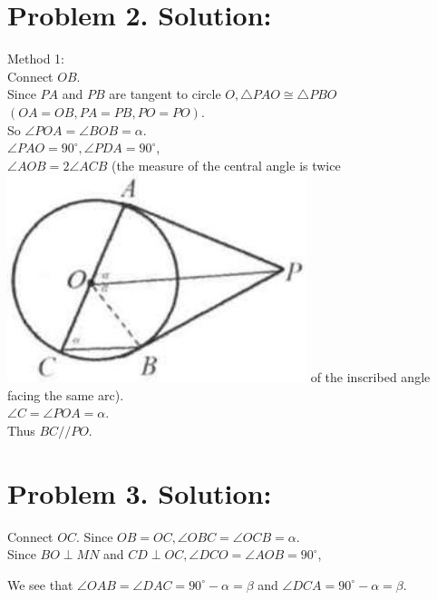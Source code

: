 \documentclass[10pt]{article}
\begin{document}
\section*{Problem 2. Solution:}
Method 1:\\
Connect \(O B\).\\
Since \(P A\) and \(P B\) are tangent to circle \(O, \triangle P A O \cong \triangle P B O\) \((O A=O B, P A=P B, P O=P O)\).\\
So \(\angle P O A=\angle B O B=\alpha\).\\
\(\angle P A O=90^{\circ}, \angle P D A=90^{\circ}\),\\
\(\angle A O B=2 \angle A C B\) (the measure of the central angle is twice\\
\includegraphics[max width=\textwidth]{2025_04_17_97bc1f7e44d93c271a88g-157} of the inscribed angle facing the same arc).\\
\(\angle C=\angle P O A=\alpha\).\\
Thus \(B C / / P O\).

\section*{Problem 3. Solution:}
Connect \(O C\). Since \(O B=O C, \angle O B C=\angle O C B=\alpha\).\\
Since \(B O \perp M N\) and \(C D \perp O C, \angle D C O=\angle A O B=90^{\circ}\),

We see that \(\angle O A B=\angle D A C=90^{\circ}-\alpha=\beta\) and \(\angle D C A=90^{\circ}-\alpha=\beta\).
\end{document}
